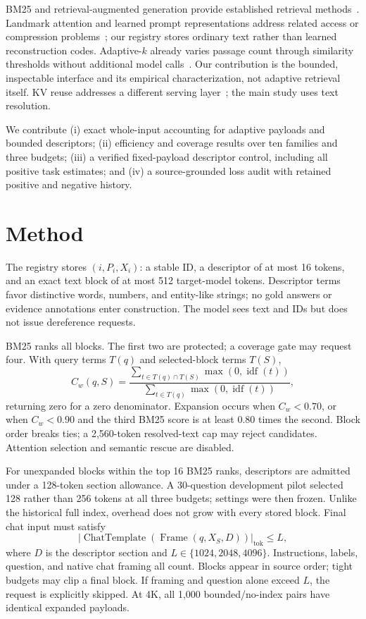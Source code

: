 \documentclass[runningheads]{llncs}
\begin{document}
BM25 and retrieval-augmented generation provide established retrieval methods~\cite{robertson2009bm25,lewis2020rag}. Landmark attention and learned prompt representations address related access or compression problems~\cite{mohtashami2023landmark,mu2023gist,cheng2024xrag}; our registry stores ordinary text rather than learned reconstruction codes. Adaptive-$k$ already varies passage count through similarity thresholds without additional model calls~\cite{taguchi2025adaptivek}. Our contribution is the bounded, inspectable interface and its empirical characterization, not adaptive retrieval itself. KV reuse addresses a different serving layer~\cite{li2024snapkv,lu2024turborag}; the main study uses text resolution.

We contribute (i) exact whole-input accounting for adaptive payloads and bounded descriptors; (ii) efficiency and coverage results over ten families and three budgets; (iii) a verified fixed-payload descriptor control, including all positive task estimates; and (iv) a source-grounded loss audit with retained positive and negative history.

\section{Method}
The registry stores $(i,P_i,X_i)$: a stable ID, a descriptor of at most 16 tokens, and an exact text block of at most 512 target-model tokens. Descriptor terms favor distinctive words, numbers, and entity-like strings; no gold answers or evidence annotations enter construction. The model sees text and IDs but does not issue dereference requests.

BM25 ranks all blocks. The first two are protected; a coverage gate may request four. With query terms $T(q)$ and selected-block terms $T(S)$,
\begin{equation}
C_w(q,S)=\frac{\sum_{t\in T(q)\cap T(S)}\max(0,\operatorname{idf}(t))}
{\sum_{t\in T(q)}\max(0,\operatorname{idf}(t))},
\end{equation}
returning zero for a zero denominator. Expansion occurs when $C_w<0.70$, or when $C_w<0.90$ and the third BM25 score is at least 0.80 times the second. Block order breaks ties; a 2,560-token resolved-text cap may reject candidates. Attention selection and semantic rescue are disabled.

For unexpanded blocks within the top 16 BM25 ranks, descriptors are admitted under a 128-token section allowance. A 30-question development pilot selected 128 rather than 256 tokens at all three budgets; settings were then frozen. Unlike the historical full index, overhead does not grow with every stored block. Final chat input must satisfy
\begin{equation}
|\operatorname{ChatTemplate}(\operatorname{Frame}(q,X_S,D))|_{\mathrm{tok}}\leq L,
\end{equation}
where $D$ is the descriptor section and $L\in\{1024,2048,4096\}$. Instructions, labels, question, and native chat framing all count. Blocks appear in source order; tight budgets may clip a final block. If framing and question alone exceed $L$, the request is explicitly skipped. At 4K, all 1,000 bounded/no-index pairs have identical expanded payloads.
\end{document}

